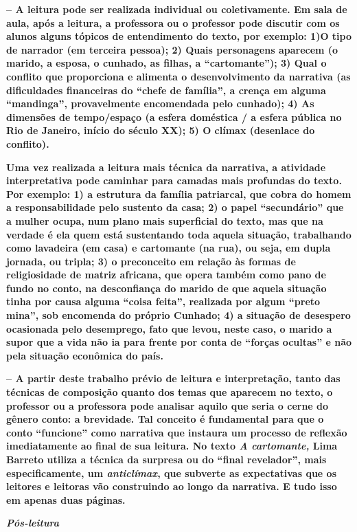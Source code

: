 \textbf{-- A leitura pode ser realizada individual ou coletivamente. Em
sala de aula, após a leitura, a professora ou o professor pode discutir
com os alunos alguns tópicos de entendimento do texto, por exemplo: 1)O
tipo de narrador (em terceira pessoa); 2) Quais personagens aparecem (o
marido, a esposa, o cunhado, as filhas, a ``cartomante''); 3) Qual o
conflito que proporciona e alimenta o desenvolvimento da narrativa (as
dificuldades financeiras do ``chefe de família'', a crença em alguma
``mandinga'', provavelmente encomendada pelo cunhado); 4) As dimensões
de tempo/espaço (a esfera doméstica / a esfera pública no Rio de
Janeiro, início do século XX); 5) O clímax (desenlace do conflito).}

\textbf{Uma vez realizada a leitura mais técnica da narrativa, a
atividade interpretativa pode caminhar para camadas mais profundas do
texto. Por exemplo: 1) a estrutura da família patriarcal, que cobra do
homem a responsabilidade pelo sustento da casa; 2) o papel
``secundário'' que a mulher ocupa, num plano mais superficial do texto,
mas que na verdade é ela quem está sustentando toda aquela situação,
trabalhando como lavadeira (em casa) e cartomante (na rua), ou seja, em
dupla jornada, ou tripla; 3) o preconceito em relação às formas de
religiosidade de matriz africana, que opera também como pano de fundo no
conto, na desconfiança do marido de que aquela situação tinha por causa
alguma ``coisa feita'', realizada por algum ``preto mina'', sob
encomenda do próprio Cunhado; 4) a situação de desespero ocasionada pelo
desemprego, fato que levou, neste caso, o marido a supor que a vida não
ia para frente por conta de ``forças ocultas'' e não pela situação
econômica do país.}

\textbf{-- A partir deste trabalho prévio de leitura e interpretação,
tanto das técnicas de composição quanto dos temas que aparecem no texto,
o professor ou a professora pode analisar aquilo que seria o cerne do
gênero conto: a brevidade. Tal conceito é fundamental para que o conto
``funcione'' como narrativa que instaura um processo de reflexão
imediatamente ao final de sua leitura. No texto \emph{A cartomante,}
Lima Barreto utiliza a técnica da surpresa ou do ``final revelador'',
mais especificamente, um \emph{anticlímax}, que subverte as expectativas
que os leitores e leitoras vão construindo ao longo da narrativa. E tudo
isso em apenas duas páginas. }

\emph{\textbf{Pós-leitura}}

